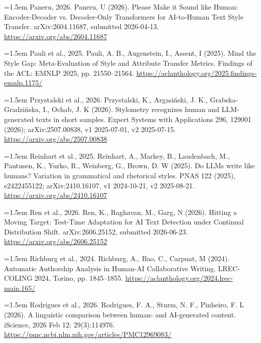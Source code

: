 \documentclass[11pt,a4paper]{article}
\renewcommand{\_}{\textunderscore\allowbreak}
\begin{document}
\noindent\hangindent=1.5em Paneru, 2026. Paneru, U (2026). Please Make it Sound like Human: Encoder-Decoder vs. Decoder-Only Transformers for AI-to-Human Text Style Transfer. arXiv:2604.11687, submitted 2026-04-13. \url{https://arxiv.org/abs/2604.11687}\par\smallskip

\noindent\hangindent=1.5em Pauli et al., 2025. Pauli, A. B., Augenstein, I., Assent, I (2025). Mind the Style Gap: Meta-Evaluation of Style and Attribute Transfer Metrics. Findings of the ACL: EMNLP 2025, pp. 21550–21564. \url{https://aclanthology.org/2025.findings-emnlp.1175/}\par\smallskip

\noindent\hangindent=1.5em Przystalski et al., 2026. Przystalski, K., Argasi\'nski, J. K., Grabska-Gradzi\'nska, I., Ochab, J. K (2026). Stylometry recognizes human and LLM-generated texts in short samples. Expert Systems with Applications 296, 129001 (2026); arXiv:2507.00838, v1 2025-07-01, v2 2025-07-15. \url{https://arxiv.org/abs/2507.00838}\par\smallskip

\noindent\hangindent=1.5em Reinhart et al., 2025. Reinhart, A., Markey, B., Laudenbach, M., Pantusen, K., Yurko, R., Weinberg, G., Brown, D. W (2025). Do LLMs write like humans? Variation in grammatical and rhetorical styles. PNAS 122 (2025), e2422455122; arXiv:2410.16107, v1 2024-10-21, v2 2025-08-21. \url{https://arxiv.org/abs/2410.16107}\par\smallskip

\noindent\hangindent=1.5em Ren et al., 2026. Ren, K., Raghavan, M., Garg, N (2026). Hitting a Moving Target: Test-Time Adaptation for AI Text Detection under Continual Distribution Shift. arXiv:2606.25152, submitted 2026-06-23. \url{https://arxiv.org/abs/2606.25152}\par\smallskip

\noindent\hangindent=1.5em Richburg et al., 2024. Richburg, A., Bao, C., Carpuat, M (2024). Automatic Authorship Analysis in Human-AI Collaborative Writing. LREC-COLING 2024, Torino, pp. 1845–1855. \url{https://aclanthology.org/2024.lrec-main.165/}\par\smallskip

\noindent\hangindent=1.5em Rodrigues et al., 2026. Rodrigues, F. A., Sturm, N. F., Pinheiro, F. L (2026). A linguistic comparison between human- and AI-generated content. iScience, 2026 Feb 12; 29(3):114976. \url{https://pmc.ncbi.nlm.nih.gov/articles/PMC12969083/}\par\smallskip
\end{document}
